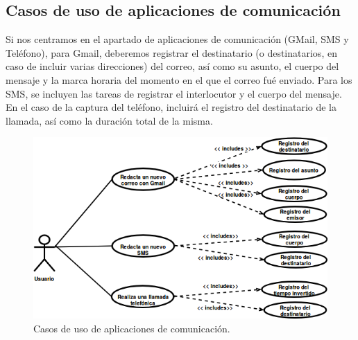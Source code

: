 \documentclass[12pt,a4paper,oneside]{book} %
\begin{document}
\subsection{Casos de uso de aplicaciones de comunicación}
Si nos centramos en el apartado de aplicaciones de comunicación (GMail, SMS y Teléfono), para Gmail, deberemos registrar el destinatario (o destinatarios, en caso de incluir varias direcciones) del correo, así como su asunto, el cuerpo del mensaje y la marca horaria del momento en el que el correo fué enviado. 
\newline \newline 
Para los SMS, se incluyen las tareas de registrar el interlocutor y el cuerpo del mensaje. En el caso de la captura del teléfono, incluirá el registro del destinatario de la llamada, así como la duración total de la misma.  
\begin{figure}[H]
	\begin{center}
		\includegraphics[scale=0.70]{pictures/usecases/usecases02.png} %
	\end{center}
	\caption[Casos de uso de aplicaciones de comunicación.]{Casos de uso de aplicaciones de comunicación.}
\end{figure}
\end{document}
